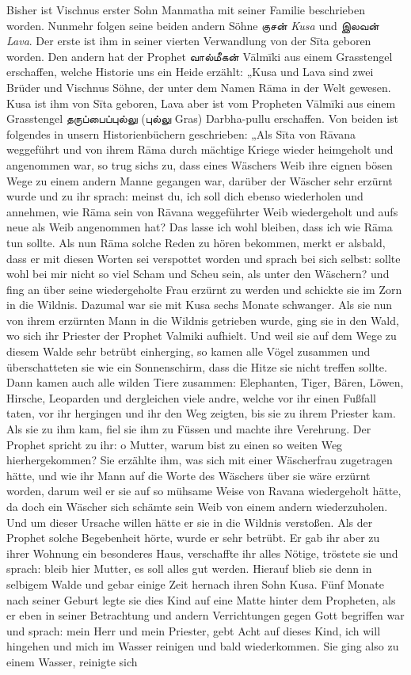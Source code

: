 \documentclass{article}
\newcommand{\TamilText}[1]{\texttamil{#1}}
\newcommand{\tam}[1]{\TamilText{#1}}
\begin{document}
Bisher ist Vischnus erster Sohn Manmatha mit seiner Familie beschrieben worden. Nunmehr folgen seine beiden andern Söhne \tam{குசன்} \emph{Kusa} und \tam{இலவன்} \emph{Lava}. Der erste ist ihm in seiner vierten Verwandlung von der S\={i}ta geboren worden. Den andern hat der Prophet \tam{வால்மீகன்} V\={a}lm\={i}ki aus einem Grasstengel erschaffen, welche Historie uns ein Heide erzählt: „Kusa und Lava sind zwei Brüder und Vischnus Söhne, der unter dem Namen R\={a}ma in der Welt gewesen. Kusa ist ihm von S\={i}ta geboren, Lava aber ist vom Propheten V\={a}lm\={i}ki aus einem Grasstengel \tam{தருப்பைப்புல்லு} (\tam{புல்லு} Gras) Darbha-pullu erschaffen. Von beiden ist folgendes in unsern Historienbüchern geschrieben: „Als S\={i}ta von R\={a}vana weggeführt und von ihrem R\={a}ma durch mächtige Kriege wieder heimgeholt und angenommen war, so trug sichs zu, dass eines Wäschers Weib ihre eignen bösen Wege zu einem andern Manne gegangen war, darüber der Wäscher sehr erzürnt wurde und zu ihr sprach: meinst du, ich soll dich ebenso wiederholen und annehmen, wie R\={a}ma sein von R\={a}vana weggeführter Weib wiedergeholt und aufs neue als Weib angenommen hat? Das lasse ich wohl bleiben, dass ich wie R\={a}ma tun sollte. Als nun R\={a}ma solche Reden zu hören bekommen, merkt er alsbald, dass er mit diesen Worten sei verspottet worden und sprach bei sich selbst: sollte wohl bei mir nicht so viel Scham und Scheu sein, als unter den Wäschern? und fing an über seine wiedergeholte Frau erzürnt zu werden und schickte sie im Zorn in die Wildnis. Dazumal war sie mit Kusa sechs Monate schwanger. Als sie nun von ihrem erzürnten Mann in die Wildnis getrieben wurde, ging sie in den Wald, wo sich ihr Priester der Prophet Valmiki aufhielt. Und weil sie auf dem Wege zu diesem Walde sehr betrübt einherging, so kamen alle Vögel zusammen und überschatteten sie wie ein Sonnenschirm, dass die Hitze sie nicht treffen sollte. Dann kamen auch alle wilden Tiere zusammen: Elephanten, Tiger, Bären, Löwen, Hirsche, Leoparden und dergleichen viele andre, welche vor ihr einen Fußfall taten, vor ihr hergingen und ihr den Weg zeigten, bis sie zu ihrem Priester kam. Als sie zu ihm kam, fiel sie ihm zu Füssen und machte ihre Verehrung. Der Prophet spricht zu ihr: o Mutter, warum bist zu einen so weiten Weg hierhergekommen? Sie erzählte ihm, was sich mit einer Wäscherfrau zugetragen hätte, und wie ihr Mann auf die Worte des Wäschers über sie wäre erzürnt worden, darum weil er sie auf so mühsame Weise von Ravana wiedergeholt hätte, da doch ein Wäscher sich schämte sein Weib von einem andern wiederzuholen. Und um dieser Ursache willen hätte er sie in die Wildnis verstoßen. Als der Prophet solche Begebenheit hörte, wurde er sehr betrübt. Er gab ihr aber zu ihrer Wohnung ein besonderes Haus, verschaffte ihr alles Nötige, tröstete sie und sprach: bleib hier Mutter, es soll alles gut werden. Hierauf blieb sie denn in selbigem Walde und gebar einige Zeit hernach ihren Sohn Kusa. Fünf Monate nach seiner Geburt legte sie dies Kind auf eine Matte hinter dem Propheten, als er eben in seiner Betrachtung und andern Verrichtungen gegen Gott begriffen war und sprach: mein Herr und mein Priester, gebt Acht auf dieses Kind, ich will hingehen und mich im Wasser reinigen und bald wiederkommen. Sie ging also zu einem Wasser, reinigte sich 
\end{document}
